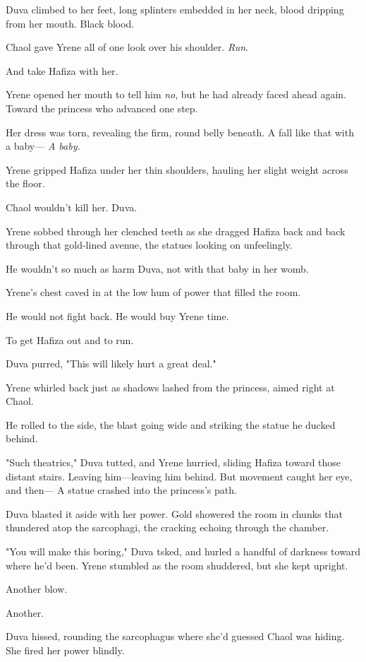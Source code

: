 Duva climbed to her feet, long splinters embedded in her neck, blood dripping from her mouth.
Black blood.

Chaol gave Yrene all of one look over his shoulder.
\emph{Run}.

And take Hafiza with her.

Yrene opened her mouth to tell him \emph{no}, but he had already faced ahead again.
Toward the princess who advanced one step.

Her dress was torn, revealing the firm, round belly beneath.
A fall like that with a baby--- \emph{A baby.}

Yrene gripped Hafiza under her thin shoulders, hauling her slight weight across the floor.

Chaol wouldn't kill her.
Duva.

Yrene sobbed through her clenched teeth as she dragged Hafiza back and back through that gold-lined avenue, the statues looking on unfeelingly.

He wouldn't so much as harm Duva, not with that baby in her womb.

Yrene's chest caved in at the low hum of power that filled the room.

He would not fight back.
He would buy Yrene time.

To get Hafiza out and to run.

Duva purred, "This will likely hurt a great deal."

Yrene whirled back just as shadows lashed from the princess, aimed right at Chaol.

He rolled to the side, the blast going wide and striking the statue he ducked behind.

"Such theatrics," Duva tutted, and Yrene hurried, sliding Hafiza toward those distant stairs.
Leaving him---leaving him behind.
But movement caught her eye, and then--- A statue crashed into the princess's path.

Duva blasted it aside with her power.
Gold showered the room in chunks that thundered atop the sarcophagi, the cracking echoing through the chamber.

"You will make this boring," Duva tsked, and hurled a handful of darkness toward where he'd been.
Yrene stumbled as the room shuddered, but she kept upright.

Another blow.

Another.

Duva hissed, rounding the sarcophagus where she'd guessed Chaol was hiding.
She fired her power blindly.

